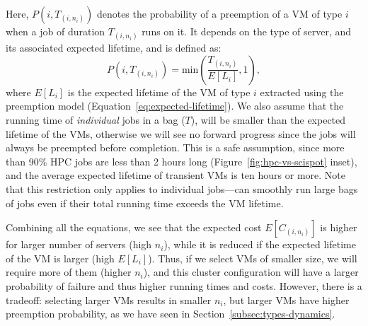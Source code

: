 Here, $P(i, T_{(i, n_i)})$ denotes the probability of a preemption of a VM of type $i$ when a job of duration $T_{(i, n_i)}$ runs on it. 
%
It depends on the type of server, and its associated expected lifetime, and is defined as:
\begin{equation}
  \label{eq:pi}
  P\left(i, T_{\left(i, n_i \right)}\right) = \text{min}\left(\dfrac{T_{(i, n_i)}}{E[L_i]}, 1\right),
\end{equation}
where $E[L_i]$ is the expected lifetime of the VM of type $i$ extracted using the preemption model (Equation~\ref{eq:expected-lifetime}).
We also assume that the running time of \emph{individual} jobs in a bag ($T$), will be smaller than the expected lifetime of the VMs, otherwise we will see no forward progress since the jobs will always be preempted before completion.
This is a safe assumption, since more than 90\% HPC jobs are less than 2 hours long (Figure~\ref{fig:hpc-vs-scispot} inset), and the average expected lifetime of transient VMs is ten hours or more.
Note that this restriction only applies to individual jobs---\sysname can smoothly run large bags of jobs even if their total running time exceeds the VM lifetime. 






Combining all the equations, we see that the expected cost $E[C_{(i, n_i)}]$ is higher for larger number of servers (high $n_i$), while it is reduced if the expected lifetime of the VM is larger (high $E[L_i]$).
%
Thus, if we select VMs of smaller size, we will require more of them (higher $n_i$), and this cluster configuration will have a larger probability of failure and thus higher running times and costs.
However, there is a tradeoff: selecting larger VMs results in smaller $n_i$, but larger VMs have higher preemption probability, as we have seen in Section~\ref{subsec:types-dynamics}. 



